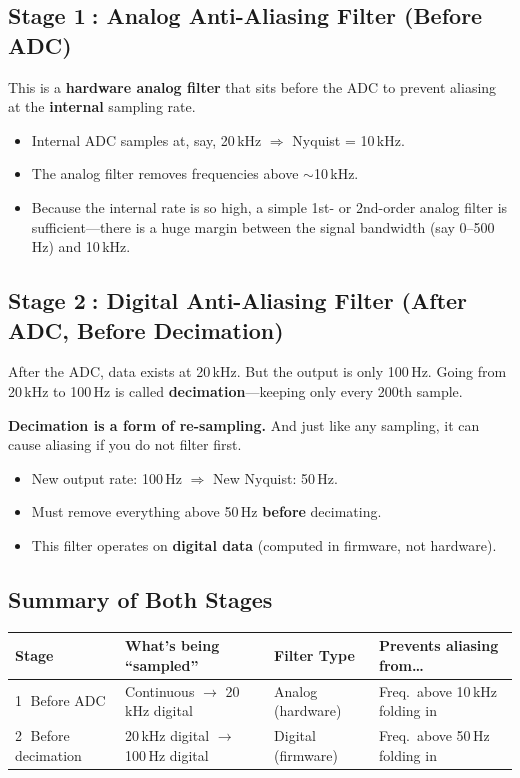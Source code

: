 \documentclass[12pt,a4paper]{article}
\begin{document}
\subsection{Stage \textcircled{1}: Analog Anti-Aliasing Filter (Before ADC)}

This is a \textbf{hardware analog filter} that sits before the ADC to prevent aliasing at the \textbf{internal} sampling rate.

\begin{itemize}
    \item Internal ADC samples at, say, 20\,kHz $\Rightarrow$ Nyquist = 10\,kHz.
    \item The analog filter removes frequencies above $\sim$10\,kHz.
    \item Because the internal rate is so high, a simple 1st- or 2nd-order analog filter is sufficient---there is a huge margin between the signal bandwidth (say 0--500\,Hz) and 10\,kHz.
\end{itemize}

\subsection{Stage \textcircled{2}: Digital Anti-Aliasing Filter (After ADC, Before Decimation)}

After the ADC, data exists at 20\,kHz. But the output is only 100\,Hz. Going from 20\,kHz to 100\,Hz is called \textbf{decimation}---keeping only every 200th sample.

\textbf{Decimation is a form of re-sampling.} And just like any sampling, it can cause aliasing if you do not filter first.

\begin{itemize}
    \item New output rate: 100\,Hz $\Rightarrow$ New Nyquist: 50\,Hz.
    \item Must remove everything above 50\,Hz \textbf{before} decimating.
    \item This filter operates on \textbf{digital data} (computed in firmware, not hardware).
\end{itemize}

\subsection{Summary of Both Stages}

\begin{center}
\begin{tabular}{llll}
    \toprule
    \textbf{Stage} & \textbf{What's being ``sampled''} & \textbf{Filter Type} & \textbf{Prevents aliasing from\ldots} \\
    \midrule
    \textcircled{1} Before ADC & Continuous $\to$ 20\,kHz digital & Analog (hardware) & Freq.\ above 10\,kHz folding in \\
    \textcircled{2} Before decimation & 20\,kHz digital $\to$ 100\,Hz digital & Digital (firmware) & Freq.\ above 50\,Hz folding in \\
    \bottomrule
\end{tabular}
\end{center}
\end{document}
